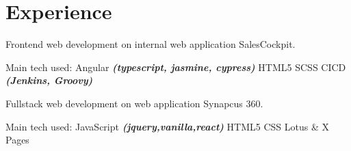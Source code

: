 \documentclass[a4paper]{deedy-resume_twopage} %
\begin{document}

\lastupdated %



\begin{minipage}[t]{0.66\textwidth} %



  \section{Experience}

  \vspace{\topsep} %
  \begin{tightitemize}
  \item Frontend web development on internal web application SalesCockpit.
  \end{tightitemize}
  Main tech used: \textbullet{} Angular {\footnotesize \textit{\textbf{(typescript, jasmine, cypress)}}} \textbullet{} HTML5 \textbullet{} SCSS \textbullet{} CICD {\footnotesize \textit{\textbf{(Jenkins, Groovy)}}}

  \sectionspace %



  \begin{tightitemize}
  \item Fullstack web development on web application Synapcus 360.
  \end{tightitemize}
  Main tech used: \textbullet{} JavaScript {\footnotesize \textit{\textbf{(jquery,vanilla,react)}}} \textbullet{} HTML5 \textbullet{} CSS \textbullet{} Lotus \& X Pages


\end{minipage}
\end{document}

